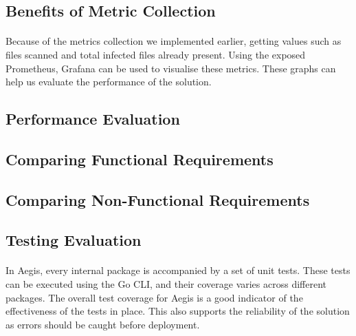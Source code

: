 \documentclass[12pt, conference, final, a4paper, onecolumn, compsoc]{IEEEtran}
\begin{document}
\subsection{Benefits of Metric Collection}
\paragraph{}
Because of the metrics collection we implemented earlier, getting values such as
files scanned and total infected files already present. Using the exposed
Prometheus, Grafana can be used to visualise these metrics. These graphs can
help us evaluate the performance of the solution.

\subsection{Performance Evaluation}
\paragraph{}



\subsection{Comparing Functional Requirements}
\paragraph{}

\subsection{Comparing Non-Functional Requirements}
\paragraph{}

\subsection{Testing Evaluation}
\paragraph{}
In Aegis, every internal package is accompanied by a set of unit tests. These
tests can be executed using the Go CLI, and their coverage varies across
different packages. The overall test coverage for Aegis is a good indicator of
the effectiveness of the tests in place. This also supports the reliability of
the solution as errors should be caught before deployment.
\end{document}
